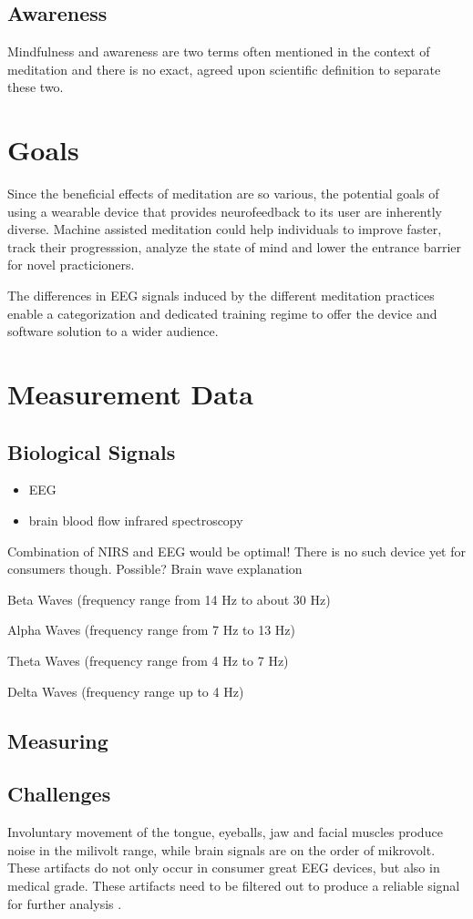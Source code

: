 \documentclass{llncs} %
\begin{document}
\subsection{Awareness}
Mindfulness and awareness are two terms often mentioned in the context of meditation and there is no exact, agreed upon scientific definition to separate these two.
\section{Goals}
Since the beneficial effects of meditation are so various, the potential goals of using a wearable device 
that provides neurofeedback to its user are inherently diverse. Machine assisted meditation could help individuals to 
improve faster, track their progresssion, analyze the state of mind and lower the entrance barrier for novel practicioners. \cite{brand:del} \

The differences in EEG signals induced by the different meditation practices enable a categorization
and dedicated training regime to offer the device and software solution to a wider audience. \cite{Travis}
\section{Measurement Data}
\subsection{Biological Signals}
\begin{itemize}
    \item EEG
    \item brain blood flow infrared spectroscopy
\end{itemize}
Combination of NIRS and EEG would be optimal! There is no such device yet for consumers though.
Possible?
Brain wave explanation



Beta Waves (frequency range from 14 Hz to about 30 Hz)


Alpha Waves (frequency range from 7 Hz to 13 Hz)


Theta Waves (frequency range from 4 Hz to 7 Hz)


Delta Waves (frequency range up to 4 Hz)
\subsection{Measuring}
\subsection{Challenges}
Involuntary movement of the tongue, eyeballs, jaw and facial muscles produce noise in the milivolt range, while brain signals are on 
the order of mikrovolt. These artifacts do not only occur in consumer great EEG devices, but also in medical grade.
These artifacts need to be filtered out to produce a reliable signal for further analysis \cite{Bashivan: et al}.
\end{document}
